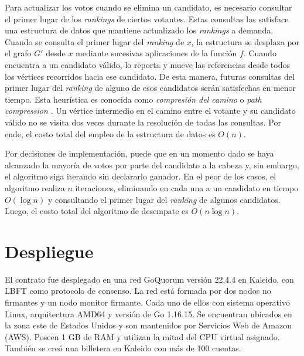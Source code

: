 Para actualizar los votos cuando se elimina un candidato, es necesario consultar el primer lugar de los \textit{rankings} de ciertos votantes. Estas consultas las satisface una estructura de datos que mantiene actualizado los \textit{rankings} a demanda. Cuando se consulta el primer lugar del \textit{ranking} de $x$, la estructura se desplaza por el grafo $G'$ desde $x$ mediante sucesivas aplicaciones de la funci\'on $f$. Cuando encuentra a un candidato v\'alido, lo reporta y mueve las referencias desde todos los v\'ertices recorridos hacia ese candidato. De esta manera, futuras consultas del primer lugar del \textit{ranking} de alguno de esos candidatos ser\'an satisfechas en menor tiempo. Esta heur\'istica es conocida como \textit{compresi\'on del camino} o \textit{path compression} \citep{intro-to-algo-3}.  Un v\'ertice intermedio en el camino entre el votante y su candidato v\'alido no se visita dos veces durante la resoluci\'on de todas las consultas. Por ende, el costo total del empleo de la estructura de datos es $O(n)$.

Por decisiones de implementaci\'on, puede que en un momento dado se haya alcanzado la mayor\'ia de  votos por parte del candidato a la cabeza y, sin embargo, el algoritmo siga iterando sin declararlo ganador. En el peor de los casos, el algoritmo realiza $n$ iteraciones, eliminando en cada una a un candidato en tiempo $O(\log n)$ y consultando el primer lugar del \textit{ranking} de algunos candidatos. Luego, el costo total del algoritmo de desempate es $O(n \log n)$.

\section{Despliegue}\label{sec:implementation:kaleido}
El contrato fue desplegado en una red GoQuorum versi\'on 22.4.4 en Kaleido,   con LBFT como protocolo de consenso.   La red est\'a formada por dos nodos no firmantes y un nodo monitor firmante. Cada uno de ellos con sistema operativo Linux, arquitectura AMD64 y versi\'on de Go 1.16.15. Se encuentran ubicados en la zona este de Estados Unidos  y son mantenidos por Servicios Web de Amazon (AWS).  Poseen 1 GB de RAM y utilizan la mitad del CPU virtual asignado.   Tambi\'en se cre\'o una billetera en Kaleido con m\'as de 100 cuentas. 

